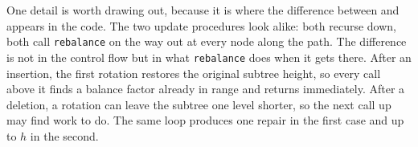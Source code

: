 One detail is worth drawing out, because it is where the difference between
 and  appears in the code. The two
update procedures look alike: both recurse down, both call \texttt{rebalance} on
the way out at every node along the path. The difference is not in the control
flow but in what \texttt{rebalance} does when it gets there. After an insertion,
the first rotation restores the original subtree height, so every call above it
finds a balance factor already in range and returns immediately. After a
deletion, a rotation can leave the subtree one level shorter, so the next call up
may find work to do. The same loop produces one repair in the first case and up
to $h$ in the second.
